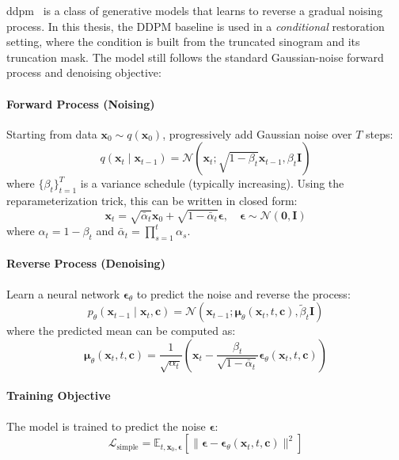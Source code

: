 \gls{ddpm}~\cite{ho2020denoising} is a class of generative models that learns to reverse a gradual noising process. In this thesis, the DDPM baseline is used in a \emph{conditional} restoration setting, where the condition is built from the truncated sinogram and its truncation mask. The model still follows the standard Gaussian-noise forward process and denoising objective:

\paragraph{Forward Process (Noising)} Starting from data $\mathbf{x}_0 \sim q(\mathbf{x}_0)$, progressively add Gaussian noise over $T$ steps:
%
\begin{equation}
q(\mathbf{x}_t \mid \mathbf{x}_{t-1}) = \mathcal{N}(\mathbf{x}_t; \sqrt{1-\beta_t}\mathbf{x}_{t-1}, \beta_t \mathbf{I})
\end{equation}
%
where $\{\beta_t\}_{t=1}^T$ is a variance schedule (typically increasing). Using the reparameterization trick, this can be written in closed form:
%
\begin{equation}
\mathbf{x}_t = \sqrt{\bar{\alpha}_t}\mathbf{x}_0 + \sqrt{1-\bar{\alpha}_t}\boldsymbol{\epsilon}, \quad \boldsymbol{\epsilon} \sim \mathcal{N}(\mathbf{0}, \mathbf{I})
\end{equation}
%
where $\alpha_t = 1 - \beta_t$ and $\bar{\alpha}_t = \prod_{s=1}^t \alpha_s$.

\paragraph{Reverse Process (Denoising)} Learn a neural network $\boldsymbol{\epsilon}_\theta$ to predict the noise and reverse the process:
%
\begin{equation}
p_\theta(\mathbf{x}_{t-1} \mid \mathbf{x}_t, \mathbf{c}) = \mathcal{N}(\mathbf{x}_{t-1}; \boldsymbol{\mu}_\theta(\mathbf{x}_t, t, \mathbf{c}), \tilde{\beta}_t \mathbf{I})
\end{equation}
%
where the predicted mean can be computed as:
%
\begin{equation}
\boldsymbol{\mu}_\theta(\mathbf{x}_t, t, \mathbf{c}) = \frac{1}{\sqrt{\alpha_t}}\left(\mathbf{x}_t - \frac{\beta_t}{\sqrt{1-\bar{\alpha}_t}}\boldsymbol{\epsilon}_\theta(\mathbf{x}_t, t, \mathbf{c})\right)
\end{equation}

\paragraph{Training Objective} The model is trained to predict the noise $\boldsymbol{\epsilon}$:
%
\begin{equation}
\mathcal{L}_{\text{simple}} = \mathbb{E}_{t, \mathbf{x}_0, \boldsymbol{\epsilon}}\left[\|\boldsymbol{\epsilon} - \boldsymbol{\epsilon}_\theta(\mathbf{x}_t, t, \mathbf{c})\|^2\right]
\label{eq:ddpm_loss}
\end{equation}

